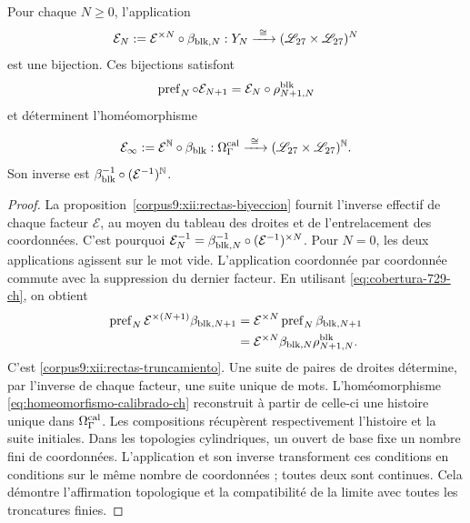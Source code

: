 \begin{theorem}
\label{corpus9:xii:rectas-homeomorfismo}
Pour chaque \(N\geq0\), l’application
\begin{equation}
 \mathcal E_N:=\mathcal E^{\times N}\circ\beta_{{\rm blk},N}:
 Y_N\xrightarrow{\ \cong\ }
 (\mathscr L_{27}\times\mathscr L_{27})^N
 \label{corpus9:xii:rectas-nivel}
\end{equation}
est une bijection. Ces bijections satisfont
\begin{equation}
 \operatorname{pref}_N\circ\mathcal E_{N+1}
 =\mathcal E_N\circ\rho^{\rm blk}_{N+1,N}
 \label{corpus9:xii:rectas-truncamiento}
\end{equation}
et déterminent l’homéomorphisme

\begin{equation}
 \mathcal E_\infty:=\mathcal E^{\mathbb N}\circ\beta_{\rm blk}:
 \Omega_\Gamma^{\rm cal}\xrightarrow{\ \cong\ }
 (\mathscr L_{27}\times\mathscr L_{27})^{\mathbb N}.
 \label{corpus9:xii:rectas-limite}
\end{equation}
Son inverse est
\(\beta_{\rm blk}^{-1}\circ(\mathcal E^{-1})^{\mathbb N}\).

\end{theorem}
\begin{proof}
La proposition~\ref{corpus9:xii:rectas-biyeccion} fournit
l’inverse effectif de chaque facteur \(\mathcal E\), au moyen du tableau
des droites et de l’entrelacement des coordonnées. C’est pourquoi
\(\mathcal E_N^{-1}=\beta_{{\rm blk},N}^{-1}
\circ(\mathcal E^{-1})^{\times N}\). Pour \(N=0\), les deux applications
agissent sur le mot vide. L’application coordonnée par coordonnée
commute avec la suppression du dernier facteur. En utilisant
\eqref{eq:cobertura-729-ch}, on obtient
\[
 \begin{aligned}
 \operatorname{pref}_N\mathcal E^{\times(N+1)}
           \beta_{{\rm blk},N+1}
 &=\mathcal E^{\times N}\operatorname{pref}_N
           \beta_{{\rm blk},N+1}\\
 &=\mathcal E^{\times N}\beta_{{\rm blk},N}
           \rho^{\rm blk}_{N+1,N}.
 \end{aligned}
\]
C’est \eqref{corpus9:xii:rectas-truncamiento}. Une suite de paires
de droites détermine, par l’inverse de chaque facteur, une suite unique
de mots. L’homéomorphisme
\eqref{eq:homeomorfismo-calibrado-ch} reconstruit à partir de celle-ci une
histoire unique dans \(\Omega_\Gamma^{\rm cal}\). Les compositions
récupèrent respectivement l’histoire et la suite initiales.
Dans les topologies cylindriques, un ouvert de base fixe un nombre fini
de coordonnées. L’application et son inverse transforment ces conditions
en conditions sur le même nombre de coordonnées ; toutes deux sont
continues. Cela démontre l’affirmation topologique et la compatibilité
de la limite avec toutes les troncatures finies.

\end{proof}

